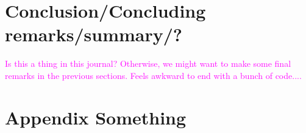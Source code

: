\documentclass[article]{jss}
\newcommand{\hl}[1]{\textcolor{magenta}{#1}}
\begin{document}
\section{Conclusion/Concluding remarks/summary/?}
\hl{Is this a thing in this journal? Otherwise, we might want to make some final remarks in the previous sections. Feels awkward to end with a bunch of code....}



\section{Appendix Something}

\end{document}
